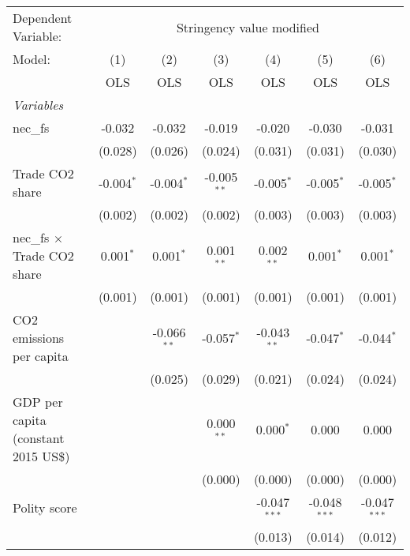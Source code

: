 
\begingroup
\centering
\begin{tabular}{lcccccc}
   \toprule
   Dependent Variable: & \multicolumn{6}{c}{Stringency value modified}\\
   Model:                               & (1)          & (2)           & (3)           & (4)            & (5)            & (6)\\  
                                        &  OLS         & OLS           & OLS           & OLS            & OLS            & OLS\\  
   \midrule
   \emph{Variables}\\
   nec\_fs                              & -0.032       & -0.032        & -0.019        & -0.020         & -0.030         & -0.031\\   
                                        & (0.028)      & (0.026)       & (0.024)       & (0.031)        & (0.031)        & (0.030)\\   
   Trade CO2 share                      & -0.004$^{*}$ & -0.004$^{*}$  & -0.005$^{**}$ & -0.005$^{*}$   & -0.005$^{*}$   & -0.005$^{*}$\\   
                                        & (0.002)      & (0.002)       & (0.002)       & (0.003)        & (0.003)        & (0.003)\\   
   nec\_fs $\times$ Trade CO2 share     & 0.001$^{*}$  & 0.001$^{*}$   & 0.001$^{**}$  & 0.002$^{**}$   & 0.001$^{*}$    & 0.001$^{*}$\\   
                                        & (0.001)      & (0.001)       & (0.001)       & (0.001)        & (0.001)        & (0.001)\\   
   CO2 emissions per capita             &              & -0.066$^{**}$ & -0.057$^{*}$  & -0.043$^{**}$  & -0.047$^{*}$   & -0.044$^{*}$\\   
                                        &              & (0.025)       & (0.029)       & (0.021)        & (0.024)        & (0.024)\\   
   GDP per capita (constant 2015 US\$)  &              &               & 0.000$^{**}$  & 0.000$^{*}$    & 0.000          & 0.000\\   
                                        &              &               & (0.000)       & (0.000)        & (0.000)        & (0.000)\\   
   Polity score                         &              &               &               & -0.047$^{***}$ & -0.048$^{***}$ & -0.047$^{***}$\\   
                                        &              &               &               & (0.013)        & (0.014)        & (0.012)\\   

\end{tabular}
